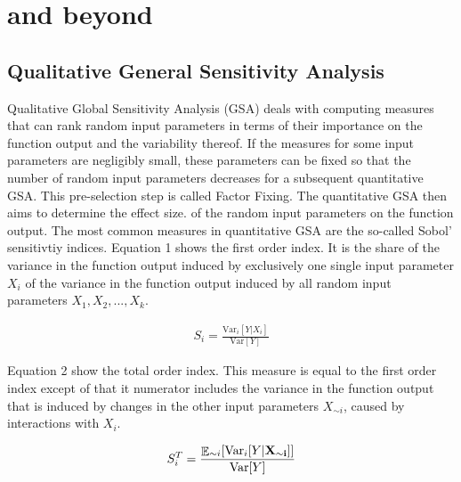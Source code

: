 \documentclass[a4paper,12pt]{article}
\DeclareMathOperator*{\E}{\mathbb{E}}
\begin{document}
\newpage %

\section{\cite{ge2017extending} and beyond}
\thispagestyle{plain} %
\cite{Morris.1991}

\cite{Saltelli.2008}

\cite{lemaire2013structural}

\cite{gentle2006random}

\cite{ge2017extending}

\cite{ge2014efficient}

\cite{campolongo2007effective}

\cite{Smith.2014}

\subsection{Qualitative General Sensitivity Analysis}
\noindent
Qualitative Global Sensitivity Analysis (GSA) deals with computing measures that can rank random input parameters in terms of their importance on the function output and the variability thereof. If the measures for some input parameters are negligibly small, these parameters can be fixed so that the number of random input parameters decreases for a subsequent quantitative GSA. This pre-selection step is called Factor Fixing. The quantitative GSA then aims to determine the effect size. of the random input parameters on the function output. The most common measures in quantitative GSA are the so-called Sobol' sensitivtiy indices. Equation 1 shows the first order index. It is the share of the variance in the function output induced by exclusively one single input parameter $X_i$ of the variance in the function output induced by all random input parameters $X_1, X_2, ..., X_k$.

\begin{align}
S_i = \frac{\text{Var}_i[Y|X_i ]}{\text{Var}[Y]}
\end{align}

Equation 2 show the total order index. This measure is equal to the first order index except of that it numerator includes the variance in the function output that is induced by changes in the other input parameters $X_{\sim i}$, caused by interactions with $X_i$.

\begin{align}
S_{i}^T = \frac{\E_{\sim i}[\text{Var}_{i}[Y|\bold{X_{\sim i}]]}}{\text{Var}[Y]}
\end{align}
\end{document}
